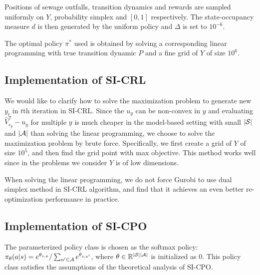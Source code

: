 Positions of sewage outfalls, transition dynamics and rewards are sampled uniformly on $Y$, probability simplex and $[0, 1]$ respectively. The state-occupancy measure $d$ is then generated by the uniform policy and $\Delta$ is set to $10^{-6}$.

The optimal policy $\pi^*$ used is obtained by solving a corresponding linear programming with true transition dynamic $P$ and a fine grid of $Y$ of size $10^6$. 



\subsection{Implementation of SI-CRL}
We would like to clarify how to solve the maximization problem to generate new $y_t$ in $t$th iteration in SI-CRL. Since the $u_y$ can be non-convex in $y$ and evaluating $\widehat V^\pi_{c_y}-u_y$ for multiple $y$ is much cheaper in the model-based setting with small $|{\mathcal{S}}|$ and $|{\mathcal{A}}|$ than solving the linear programming, we choose to solve the maximization problem by brute force.
Specifically, we first create a grid of $Y$ of size $10^5$, and then find the grid point with max objective.
This method works well since in the problems we consider $Y$ is of low dimensions.

When solving the linear programming, we do not force Gurobi to use dual simplex method in SI-CRL algorithm, and find that it achieves an even better re-optimization performance in practice. 

\subsection{Implementation of SI-CPO}
The parameterized policy class is chosen as the softmax policy: $\pi_\theta(a|s)=e^{\theta_{s,a}}/\sum_{a^\prime\in {\mathcal{A}}}e^{\theta_{s,a^\prime}}$, where $\theta\in{\mathbb R}^{|{\mathcal{S}}||{\mathcal{A}}|}$ is initialized as $0$. This policy class satisfies the assumptions of the theoretical analysis of SI-CPO.


